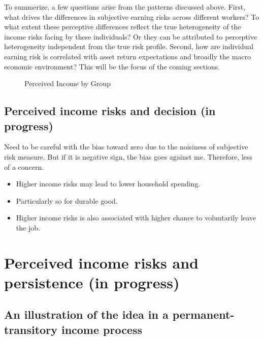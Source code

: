 \documentclass[12pt,notitlepage,onecolumn,aps,pra]{article}
\providecommand{\tightlist}{%
      \setlength{\itemsep}{0pt}\setlength{\parskip}{0pt}}
\begin{document}
To summerize, a few questions arise from the patterns discussed above.
First, what drives the differences in subjective earning risks across
different workers? To what extent these perceptive differences reflect
the true heterogeneity of the income risks facing by these individuals?
Or they can be attributed to perceptive heterogeneity independent from
the true risk profile. Second, how are individual earning risk is
correlated with asset return expectations and broadly the macro economic
environment? This will be the focus of the coming sections.


    \begin{figure*}[!ht]
        \begin{center}\end{center}
        \caption{Perceived Income by Group}
        \label{fig:boxplotbygroup}
    \end{figure*}
    


    \hypertarget{perceived-income-risks-and-decision-in-progress}{%
\subsection{Perceived income risks and decision (in
progress)}\label{perceived-income-risks-and-decision-in-progress}}

Need to be careful with the bias toward zero due to the noisiness of
subjective risk measure. But if it is negative sign, the bias goes
against me. Therefore, less of a concern.

\begin{itemize}
\tightlist
\item
  Higher income risks may lead to lower household spending.
\item
  Particularly so for durable good.
\item
  Higher income risks is also associated with higher chance to
  voluntarily leave the job.
\end{itemize}

    \hypertarget{perceived-income-risks-and-persistence-in-progress}{%
\section{Perceived income risks and persistence (in
progress)}\label{perceived-income-risks-and-persistence-in-progress}}

\hypertarget{an-illustration-of-the-idea-in-a-permanent-transitory-income-process}{%
\subsection{An illustration of the idea in a permanent-transitory income
process}\label{an-illustration-of-the-idea-in-a-permanent-transitory-income-process}}
\end{document}
